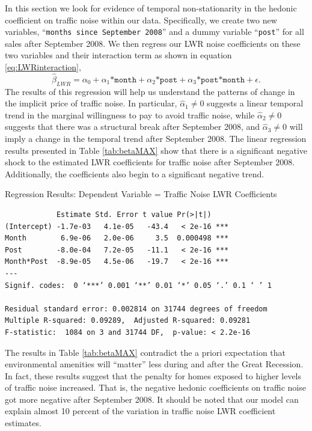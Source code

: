 \documentclass{article}\usepackage{graphicx, color}
\begin{document}
In this section we look for evidence of temporal non-stationarity in the hedonic coefficient on traffic noise within our data. Specifically, we create two new variables, ``\texttt{months since September 2008}'' and a dummy variable ``\texttt{post}'' for all sales after September 2008. We then regress our LWR noise coefficients on these two variables and their interaction term as shown in equation \eqref{eq:LWRinteraction}, 
\begin{equation}\label{eq:LWRinteraction}
\hat{\beta}_{LWR} = \alpha _0 + \alpha _1 \texttt{*month} + \alpha _2  \texttt{*post} + \alpha _3 \texttt{*post*month} + \epsilon.
\end{equation}
The results of this regression will help us understand the patterns of change in the implicit price of traffic noise. In particular, $\hat{\alpha}_1 \neq 0$ suggests a linear temporal trend in the marginal willingness to pay to avoid traffic noise, while $\hat{\alpha}_2 \neq 0$ suggests that there was a structural break after September 2008, and $\hat{\alpha}_3 \neq 0$ will imply a change in the temporal trend after September 2008. The linear regression results presented in Table \ref{tab:betaMAX} show that there is a significant negative shock to the estimated LWR coefficients for traffic noise after September 2008. Additionally, the coefficients also begin to a significant negative trend.
\begin{table}[h]
\caption{Regression Results: Dependent Variable = Traffic Noise LWR Coefficients}\label{tab:betaMAX}
\begin{verbatim}
            Estimate Std. Error t value Pr(>|t|)   
(Intercept) -1.7e-03   4.1e-05   -43.4   < 2e-16 ***
Month        6.9e-06   2.0e-06     3.5  0.000498 ***
Post        -8.0e-04   7.2e-05   -11.1   < 2e-16 ***
Month*Post  -8.9e-05   4.5e-06   -19.7   < 2e-16 ***
---
Signif. codes:  0 ‘***’ 0.001 ‘**’ 0.01 ‘*’ 0.05 ‘.’ 0.1 ‘ ’ 1 

Residual standard error: 0.002814 on 31744 degrees of freedom
Multiple R-squared: 0.09289,  Adjusted R-squared: 0.09281 
F-statistic:  1084 on 3 and 31744 DF,  p-value: < 2.2e-16 
\end{verbatim}
\end{table}

The results in Table \ref{tab:betaMAX} contradict the a priori expectation that environmental amenities will ``matter'' less during and after the Great Recession. In fact, these results suggest that the penalty for homes exposed to higher levels of traffic noise increased. That is, the negative hedonic coefficients on traffic noise got more negative after September 2008. It should be noted that our model can explain almost 10 percent of the variation in traffic noise LWR coefficient estimates. 
\end{document}
